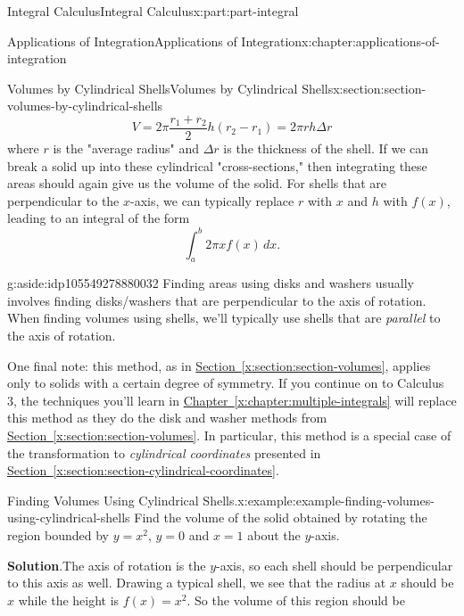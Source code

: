 \documentclass[twoside,10pt,]{book}
\newcommand{\blocktitlefont}{\relax}
\newcommand{\xreffont}{\relax}
\numberwithin{equation}{part}
\begin{document}
\begin{partptx}{Integral Calculus}{}{Integral Calculus}{}{}{x:part:part-integral}
\begin{chapterptx}{Applications of Integration}{}{Applications of Integration}{}{}{x:chapter:applications-of-integration}
\begin{sectionptx}{Volumes by Cylindrical Shells}{}{Volumes by Cylindrical Shells}{}{}{x:section:section-volumes-by-cylindrical-shells}
\begin{equation}
V = 2\pi\frac{r_{1} + r_{2}}{2}h(r_{2} - r_{1}) = 2\pi rh\Delta r\label{x:men:equation-volume-cylindrical-shell}
\end{equation}
where \(r\) is the "average radius" and \(\Delta r\) is the thickness of the shell. If we can break a solid up into these cylindrical "cross-sections," then integrating these areas should again give us the volume of the solid. For shells that are perpendicular to the \(x\)-axis, we can typically replace \(r\) with \(x\) and \(h\) with \(f(x)\), leading to an integral of the form%
\begin{equation*}
\int_{a}^{b}2\pi xf(x)\,dx.
\end{equation*}
\begin{aside}{}{g:aside:idp105549278880032}%
Finding areas using disks and washers usually involves finding disks\slash{}washers that are perpendicular to the axis of rotation. When finding volumes using shells, we'll typically use shells that are \emph{parallel} to the axis of rotation.%
\end{aside}
%
\par
One final note: this method, as in \hyperref[x:section:section-volumes]{Section~{\xreffont\ref{x:section:section-volumes}}}, applies only to solids with a certain degree of symmetry. If you continue on to Calculus 3, the techniques you'll learn in \hyperref[x:chapter:multiple-integrals]{Chapter~{\xreffont\ref{x:chapter:multiple-integrals}}} will replace this method as they do the disk and washer methods from \hyperref[x:section:section-volumes]{Section~{\xreffont\ref{x:section:section-volumes}}}. In particular, this method is a special case of the transformation to \emph{cylindrical coordinates} presented in \hyperref[x:section:section-cylindrical-coordinates]{Section~{\xreffont\ref{x:section:section-cylindrical-coordinates}}}.%
\begin{example}{Finding Volumes Using Cylindrical Shells.}{x:example:example-finding-volumes-using-cylindrical-shells}%
Find the volume of the solid obtained by rotating the region bounded by \(y = x^{2}\), \(y = 0\) and \(x = 1\) about the \(y\)-axis.%
\par\smallskip%
\noindent\textbf{\blocktitlefont Solution}.\hypertarget{g:solution:idp105549279344544}{}\quad{}The axis of rotation is the \(y\)-axis, so each shell should be perpendicular to this axis as well. Drawing a typical shell, we see that the radius at \(x\) should be \(x\) while the height is \(f(x) = x^{2}\). So the volume of this region should be%

\end{example}
\end{sectionptx}
\end{chapterptx}
\end{partptx}
\end{document}
